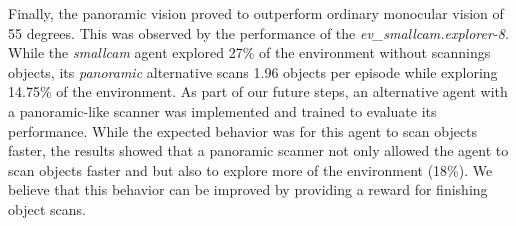     Finally, the panoramic vision proved to outperform ordinary monocular vision of 55 degrees. This was observed by the performance of the \textit{ev\_smallcam.explorer-8}. While the \textit{smallcam} agent explored 27\% of the environment without scannings objects, its \textit{panoramic} alternative scans 1.96 objects per episode while exploring 14.75\% of the environment. As part of our future steps, an alternative agent with a panoramic-like scanner was implemented and trained to evaluate its performance. While the expected behavior was for this agent to scan objects faster, the results showed that a panoramic scanner not only allowed the agent to scan objects faster and but also to explore more of the environment (18\%). We believe that this behavior can be improved by providing a reward for finishing object scans.
    
    
    
    
    
    
